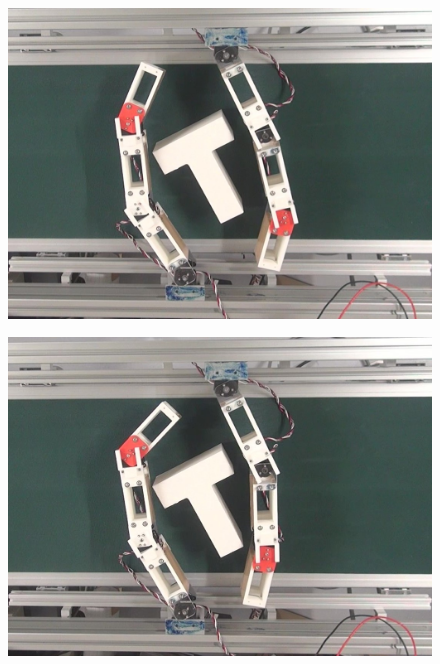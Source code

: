 \documentclass[a4paper,twoside,12pt,papersize, dvipdfmx]{iirthesis}
\begin{document}
\begin{figure}[hbt]
\centering
\begin{minipage}{0.249\hsize}
\centering
\includegraphics[width=0.98\hsize]{fig/4-manipulation-result/TShape/1-1.jpg}
\subcaption{}\label{}
\end{minipage}\hfill
\begin{minipage}{0.249\hsize}
\centering
\includegraphics[width=0.98\hsize]{fig/4-manipulation-result/TShape/1-2.jpg}
\subcaption{}\label{}
\end{minipage}\hfill
\begin{minipage}{0.249\hsize}
\centering

\end{minipage}
\end{figure}
\end{document}
